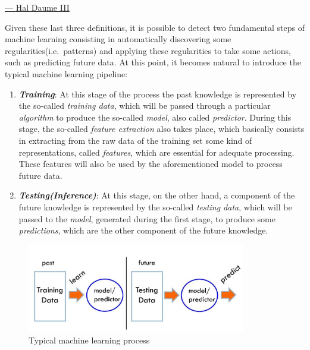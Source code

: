 \hspace{325pt}
\href{https://www.cs.ubc.ca/~murphyk/}{--- \underline{Hal Daume III}}

\vspace{10mm}

Given these last three definitions, it is possible to detect two
fundamental steps of machine learning consisting in automatically
discovering some regularities(i.e.\ patterns) and applying these
regularities to take some actions, such as predicting future data. At
this point, it becomes natural to introduce the typical machine learning
pipeline:

\begin{enumerate}
    \item \emph{\textbf{Training}}: At this stage of the process the
          past knowledge is represented by the so-called \emph{training data},
          which will be passed through a particular \emph{algorithm}
          to produce the so-called \emph{model}, also called
          \emph{predictor}. During this stage, the so-called
          \emph{feature extraction} also takes place, which basically
          consists in extracting from the raw data of the training
          set some kind of representations, called \emph{features},
          which are essential for adequate processing. These features
          will also be used by the aforementioned model to process
          future data.
    \item \emph{\textbf{Testing(Inference)}}: At this stage, on the
          other hand, a component of the future knowledge is represented
          by the so-called \emph{testing data}, which will be passed to
          the \emph{model}, generated during the first stage, to produce
          some \emph{predictions}, which are the other component of the
          future knowledge.
\end{enumerate}


\begin{figure}[h]
    \centering
    \includegraphics[width=0.85\textwidth]{../img/Typical_ML_process}
    \caption{Typical machine learning process}
\end{figure}

